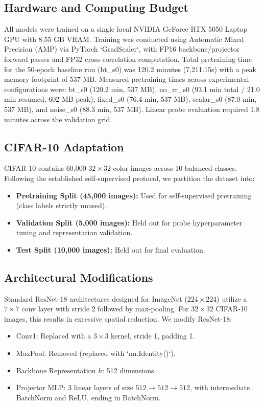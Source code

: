 \documentclass[conference]{IEEEtran}
\begin{document}
\subsection{Hardware and Computing Budget}
All models were trained on a single local NVIDIA GeForce RTX 5050 Laptop GPU with 8.55 GB VRAM. Training was conducted using Automatic Mixed Precision (AMP) via PyTorch `GradScaler`, with FP16 backbone/projector forward passes and FP32 cross-correlation computation. Total pretraining time for the 50-epoch baseline run (bt_s0) was 120.2 minutes (7,211.15s) with a peak memory footprint of 537 MB. Measured pretraining times across experimental configurations were: bt_s0 (120.2 min, 537 MB), no_rr_s0 (93.1 min total / 21.0 min resumed, 602 MB peak), fixed_s0 (76.4 min, 537 MB), scalar_s0 (87.0 min, 537 MB), and noise_s0 (88.3 min, 537 MB). Linear probe evaluation required 1.8 minutes across the validation grid.

\subsection{CIFAR-10 Adaptation}
CIFAR-10 contains 60,000 $32 \times 32$ color images across 10 balanced classes. Following the established self-supervised protocol, we partition the dataset into:
\begin{itemize}
    \item \textbf{Pretraining Split (45,000 images):} Used for self-supervised pretraining (class labels strictly unused).
    \item \textbf{Validation Split (5,000 images):} Held out for probe hyperparameter tuning and representation validation.
    \item \textbf{Test Split (10,000 images):} Held out for final evaluation.
\end{itemize}

\subsection{Architectural Modifications}
Standard ResNet-18 architectures designed for ImageNet ($224 \times 224$) utilize a $7 \times 7$ conv layer with stride 2 followed by max-pooling. For $32 \times 32$ CIFAR-10 images, this results in excessive spatial reduction. We modify ResNet-18:
\begin{itemize}
    \item Conv1: Replaced with a $3 \times 3$ kernel, stride 1, padding 1.
    \item MaxPool: Removed (replaced with `nn.Identity()`).
    \item Backbone Representation $h$: 512 dimensions.
    \item Projector MLP: 3 linear layers of size $512 \to 512 \to 512$, with intermediate BatchNorm and ReLU, ending in BatchNorm.
\end{itemize}
\end{document}
